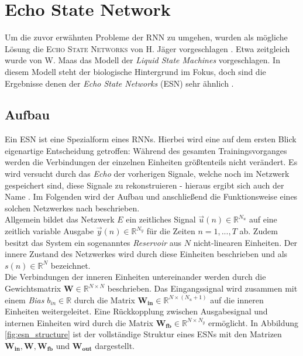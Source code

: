\section{Echo State Network}
\label{sc:esn}
Um die zuvor erwähnten Probleme der \textsc{RNN} zu umgehen, wurden als mögliche Lösung die \textsc{Echo State Networks} von H. Jäger vorgeschlagen \cite{jaeger2010}. Etwa zeitgleich wurde von W. Maas das Modell der \textit{Liquid State Machines} vorgeschlagen. In diesem Modell steht der biologische Hintergrund im Fokus, doch sind die Ergebnisse denen der \textit{Echo State Networks} (\textsc{ESN}) sehr ähnlich \citep{Maass2011}. 

\subsection{Aufbau}
\label{sec:esn_structure}
Ein \textsc{ESN} ist eine Spezialform eines \textsc{RNN}s. Hierbei wird eine auf dem ersten Blick eigenartige Entscheidung getroffen: Während des gesamten Trainingsvorganges werden die Verbindungen der einzelnen Einheiten größtenteils nicht verändert. Es wird versucht durch das \textit{Echo} der vorherigen Signale, welche noch im Netzwerk gespeichert sind, diese Signale zu rekonstruieren - hieraus ergibt sich auch der Name \cite{lukoseviciusa2009}. Im Folgenden wird der Aufbau und anschließend die Funktionsweise eines solchen Netzwerkes nach \citep{jaeger2007} beschrieben.\\

Allgemein bildet das Netzwerk $E$ ein zeitliches Signal $\vec{u}(n) \in \mathbb{R}^{N_u}$  auf eine zeitlich variable Ausgabe $\vec{y}(n) \in \mathbb{R}^{N_y}$ für die Zeiten $n=1, ..., T$ ab. Zudem besitzt das System ein sogenanntes \textit{Reservoir} aus $N$ nicht-linearen Einheiten. Der innere Zustand des Netzwerkes wird durch diese Einheiten beschrieben und als $s(n) \in \mathbb{R}^{N}$ bezeichnet.\\

Die Verbindungen der inneren Einheiten untereinander werden durch die Gewichtsmatrix $\mathbf{W} \in \mathbb{R}^{N \times N}$ beschrieben. Das Eingangssignal wird zusammen mit einem \textit{Bias} $b_{in} \in \mathbb{R}$ durch die Matrix $\mathbf{W_{in}} \in \mathbb{R}^{N \times (N_u+1)}$ auf die inneren Einheiten weitergeleitet. Eine Rückkopplung zwischen Ausgabesignal und internen Einheiten wird durch die Matrix $\mathbf{W_{fb}} \in \mathbb{R}^{N \times N_y}$ ermöglicht. In Abbildung \ref{fig:esn_structure} ist der vollständige Struktur eines \textsc{ESN}s mit den Matrizen $\mathbf{W_{in}}, \mathbf{W}, \mathbf{W_{fb}}$ und $\mathbf{W_{out}}$ dargestellt.

